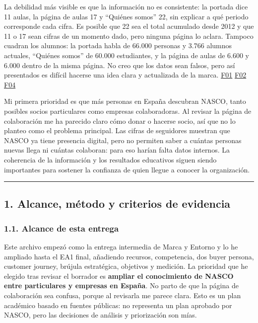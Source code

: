 \documentclass[
]{article}
\begin{document}
La debilidad más visible es que la información no es consistente: la
portada dice 11 aulas, la página de aulas 17 y ``Quiénes somos'' 22, sin
explicar a qué periodo corresponde cada cifra. Es posible que 22 sea el
total acumulado desde 2012 y que 11 o 17 sean cifras de un momento dado,
pero ninguna página lo aclara. Tampoco cuadran los alumnos: la portada
habla de 66.000 personas y 3.766 alumnos actuales, ``Quiénes somos'' de
60.000 estudiantes, y la página de aulas de 6.600 y 6.000 dentro de la
misma página. No creo que los datos sean falsos, pero así presentados es
difícil hacerse una idea clara y actualizada de la marca.
\href{https://nascoict.org/}{F01}
\href{https://nascoict.org/quienes-somos/}{F02}
\href{https://nascoict.org/aulas-informaticas/}{F04}

Mi primera prioridad es que más personas en España descubran NASCO,
tanto posibles socios particulares como empresas colaboradoras. Al
revisar la página de colaboración me ha parecido claro cómo donar o
hacerse socio, así que no lo planteo como el problema principal. Las
cifras de seguidores muestran que NASCO ya tiene presencia digital, pero
no permiten saber a cuántas personas nuevas llega ni cuántas colaboran:
para eso harían falta datos internos. La coherencia de la información y
los resultados educativos siguen siendo importantes para sostener la
confianza de quien llegue a conocer la organización.

\begin{center}\rule{0.5\linewidth}{0.5pt}\end{center}

\hypertarget{alcance-muxe9todo-y-criterios-de-evidencia}{%
\subsection{1. Alcance, método y criterios de
evidencia}\label{alcance-muxe9todo-y-criterios-de-evidencia}}

\hypertarget{alcance-de-esta-entrega}{%
\subsubsection{1.1. Alcance de esta
entrega}\label{alcance-de-esta-entrega}}

Este archivo empezó como la entrega intermedia de Marca y Entorno y lo
he ampliado hasta el EA1 final, añadiendo recursos, competencia, dos
buyer persona, customer journey, brújula estratégica, objetivos y
medición. La prioridad que he elegido tras revisar el borrador es
\textbf{ampliar el conocimiento de NASCO entre particulares y empresas
en España}. No parto de que la página de colaboración sea confusa,
porque al revisarla me parece clara. Esto es un plan académico basado en
fuentes públicas: no representa un plan aprobado por NASCO, pero las
decisiones de análisis y priorización son mías.
\end{document}

